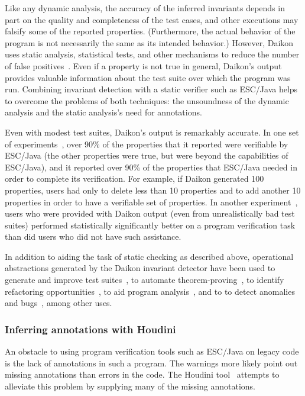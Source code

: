 Like any dynamic analysis, the accuracy of the inferred invariants
depends in part on the quality and completeness of the test cases, and
other executions may falsify some of the reported properties.
(Furthermore, the actual behavior of the program is not necessarily
the same as its intended behavior.)  However, Daikon uses static
analysis, statistical tests, and other mechanisms to reduce the number
of false positives~\cite{ErnstCGN2000:Relevance}.  Even if a property
is not true in general, Daikon's output provides valuable information
about the test suite over which the program was run.  Combining
invariant detection with a static verifier such as ESC/Java helps to
overcome the problems of both techniques: the unsoundness of the
dynamic analysis and the static analysis's need for annotations.

Even with modest test suites, Daikon's output is remarkably accurate.
In one set of experiments~\cite{NimmerE02:ISSTA}, over 90\% of the
properties that it reported were verifiable by ESC/Java (the other
properties were true, but were beyond the capabilities of ESC/Java),
and it reported over 90\% of the properties that ESC/Java needed in
order to complete its verification.  For example, if Daikon generated
100 properties, users had only to delete less than 10 properties and
to add another 10 properties in order to have a verifiable set of
properties.  In another experiment~\cite{NimmerE02:FSE}, users who
were provided with Daikon output (even from unrealistically bad test
suites) performed statistically significantly better on a program
verification task than did users who did not have such assistance.

In addition to aiding the task of static checking as described above,
operational abstractions generated by the Daikon invariant detector
have been used to generate and improve test
suites~\cite{HarderME03,XieN2003:ASE,GuptaH2003}, to automate
theorem-proving~\cite{NeWinE02:TR841,NeWinEGKL04:STTT}, to identify
refactoring opportunities~\cite{KataokaEGN01}, to aid program
analysis~\cite{DodooDLE02,DodooLE2003:TR}, and to to detect anomalies
and bugs~\cite{RazKS2002,GroceV2003,Brun2003}, among other uses.

\subsubsection{Inferring annotations with Houdini}
\label{houdini}

An obstacle to using program verification tools such as ESC/Java on
legacy code is the lack of annotations in such a program.  The
warnings
more likely point out missing annotations than errors in the code.
The Houdini tool~\cite{FlanaganL01,Houdini-theory:IPL} attempts
to alleviate this problem by supplying many of the missing
annotations.

